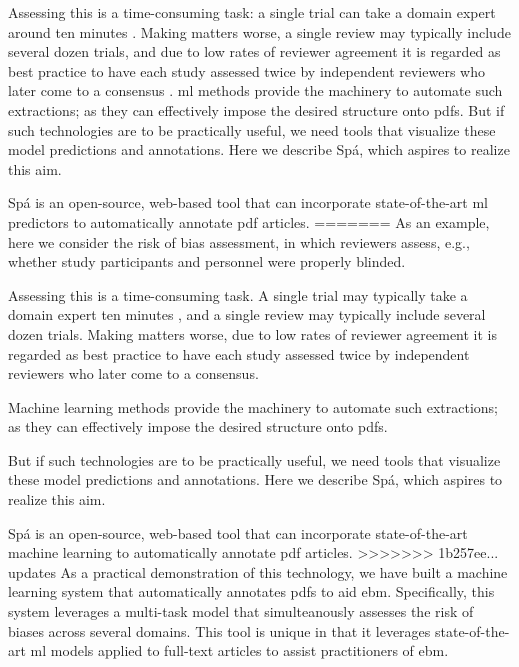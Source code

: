 \documentclass[runningheads,a4paper]{llncs}
\begin{document}
Assessing this is a time-consuming task: a single trial can take a domain expert around ten minutes \cite{Hartling2011}.
Making matters worse, a single review may typically include several dozen trials, and due to low rates of reviewer agreement it is regarded as best practice to have each study assessed twice by independent reviewers who later come to a consensus \cite{Hartling2009}.
\ac{ml} methods provide the machinery to automate such extractions; as they can effectively impose the desired structure onto \acp{pdf}.
But if such technologies are to be practically useful, we need tools that visualize these model predictions and annotations.
Here we describe Spá, which aspires to realize this aim.

Spá is an open-source, web-based tool that can incorporate state-of-the-art \acl{ml} predictors to automatically annotate \ac{pdf} articles.
=======
As an example, here we consider the risk of bias assessment, in which reviewers assess, e.g., whether study participants and personnel were properly blinded.

Assessing this is a time-consuming task.
A single trial may typically take a domain expert ten minutes \cite{Hartling2011}, and a single review may typically include several dozen trials.
Making matters worse, due to low rates of reviewer agreement it is regarded as best practice to have each study assessed twice by independent reviewers who later come to a consensus.\cite{Hartling2009}

Machine learning methods provide the machinery to automate such extractions; as they can effectively impose the desired structure onto \acp{pdf}. 

But if such technologies are to be practically useful, we need tools that visualize these model predictions and annotations.
Here we describe Spá, which aspires to realize this aim.

Spá is an open-source, web-based tool that can incorporate state-of-the-art machine learning to automatically annotate \ac{pdf} articles.
>>>>>>> 1b257ee... updates
As a practical demonstration of this technology, we have built a machine learning system that automatically annotates \acp{pdf} to aid \ac{ebm}.
Specifically, this system leverages a multi-task model that simulteanously assesses the risk of biases across several domains.
This tool is unique in that it leverages state-of-the-art \acl{ml} models applied to full-text articles to assist practitioners of \ac{ebm}.
\end{document}
